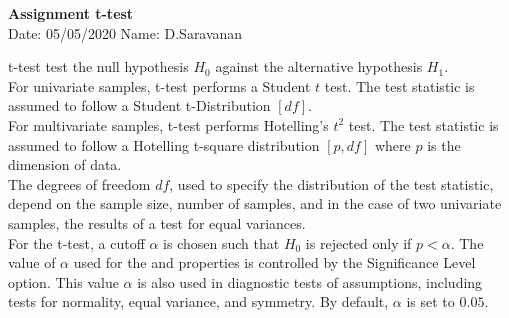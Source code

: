 \documentclass[a4paper,11pt,openright]{report}
\begin{document}
\singlespacing
\pagestyle{plain}

\begin{center}
\textbf{Assignment t-test} \\
Date: 05/05/2020 \hspace{2mm} Name: D.Saravanan
\end{center}

\vspace{10px}

t-test test the null hypothesis $H_{0}$ against the alternative hypothesis $H_{1}$. \\

For univariate samples, t-test performs a Student $t$ test. The test statistic is assumed to
follow a Student t-Distribution $[df]$. \\ 

For multivariate samples, t-test performs Hotelling's $t^{2}$ test. The test statistic is
assumed to follow a Hotelling t-square distribution $[p,df]$ where $p$ is the dimension of
data. \\

The degrees of freedom $df$, used to specify the distribution of the test statistic, depend 
on the sample size, number of samples, and in the case of two univariate samples, the 
results of a test for equal variances. \\ 

For the t-test, a cutoff $\alpha$ is chosen such that $H_{0}$ is rejected only if $p < 
\alpha$. The value of $\alpha$ used for the  and  properties is controlled by the Significance Level option. This value $\alpha$ 
is also used in diagnostic tests of assumptions, including tests for normality, equal 
variance, and symmetry. By default, $\alpha$ is set to $0.05$. \\
\end{document}
